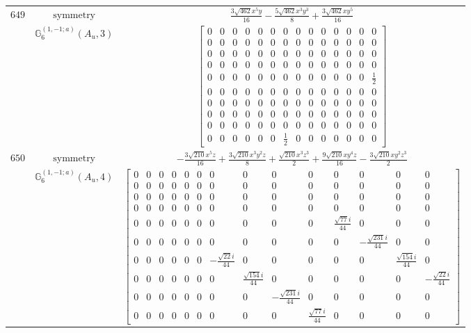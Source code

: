 \documentclass[fleqn,8pt,landscape]{jsarticle}
\begin{document}
\begin{longtable}{ccc}
$ 649 $ & $ \text{symmetry} $ & $ \frac{3 \sqrt{462} x^{5} y}{16} - \frac{5 \sqrt{462} x^{3} y^{3}}{8} + \frac{3 \sqrt{462} x y^{5}}{16} $ \\
$  $ & $ \mathbb{G}_{6}^{(1,-1;a)}(A_{u},3) $ & $ \begin{bmatrix} 0 & 0 & 0 & 0 & 0 & 0 & 0 & 0 & 0 & 0 & 0 & 0 & 0 & 0 \\ 0 & 0 & 0 & 0 & 0 & 0 & 0 & 0 & 0 & 0 & 0 & 0 & 0 & 0 \\ 0 & 0 & 0 & 0 & 0 & 0 & 0 & 0 & 0 & 0 & 0 & 0 & 0 & 0 \\ 0 & 0 & 0 & 0 & 0 & 0 & 0 & 0 & 0 & 0 & 0 & 0 & 0 & 0 \\ 0 & 0 & 0 & 0 & 0 & 0 & 0 & 0 & 0 & 0 & 0 & 0 & 0 & \frac{1}{2} \\ 0 & 0 & 0 & 0 & 0 & 0 & 0 & 0 & 0 & 0 & 0 & 0 & 0 & 0 \\ 0 & 0 & 0 & 0 & 0 & 0 & 0 & 0 & 0 & 0 & 0 & 0 & 0 & 0 \\ 0 & 0 & 0 & 0 & 0 & 0 & 0 & 0 & 0 & 0 & 0 & 0 & 0 & 0 \\ 0 & 0 & 0 & 0 & 0 & 0 & 0 & 0 & 0 & 0 & 0 & 0 & 0 & 0 \\ 0 & 0 & 0 & 0 & 0 & 0 & \frac{1}{2} & 0 & 0 & 0 & 0 & 0 & 0 & 0 \end{bmatrix} $ \\ \hline
$ 650 $ & $ \text{symmetry} $ & $ - \frac{3 \sqrt{210} x^{5} z}{16} + \frac{3 \sqrt{210} x^{3} y^{2} z}{8} + \frac{\sqrt{210} x^{3} z^{3}}{2} + \frac{9 \sqrt{210} x y^{4} z}{16} - \frac{3 \sqrt{210} x y^{2} z^{3}}{2} $ \\
$  $ & $ \mathbb{G}_{6}^{(1,-1;a)}(A_{u},4) $ & $ \begin{bmatrix} 0 & 0 & 0 & 0 & 0 & 0 & 0 & 0 & 0 & 0 & 0 & 0 & 0 & 0 \\ 0 & 0 & 0 & 0 & 0 & 0 & 0 & 0 & 0 & 0 & 0 & 0 & 0 & 0 \\ 0 & 0 & 0 & 0 & 0 & 0 & 0 & 0 & 0 & 0 & 0 & 0 & 0 & 0 \\ 0 & 0 & 0 & 0 & 0 & 0 & 0 & 0 & 0 & 0 & 0 & 0 & 0 & 0 \\ 0 & 0 & 0 & 0 & 0 & 0 & 0 & 0 & 0 & 0 & \frac{\sqrt{77} i}{44} & 0 & 0 & 0 \\ 0 & 0 & 0 & 0 & 0 & 0 & 0 & 0 & 0 & 0 & 0 & - \frac{\sqrt{231} i}{44} & 0 & 0 \\ 0 & 0 & 0 & 0 & 0 & 0 & - \frac{\sqrt{22} i}{44} & 0 & 0 & 0 & 0 & 0 & \frac{\sqrt{154} i}{44} & 0 \\ 0 & 0 & 0 & 0 & 0 & 0 & 0 & \frac{\sqrt{154} i}{44} & 0 & 0 & 0 & 0 & 0 & - \frac{\sqrt{22} i}{44} \\ 0 & 0 & 0 & 0 & 0 & 0 & 0 & 0 & - \frac{\sqrt{231} i}{44} & 0 & 0 & 0 & 0 & 0 \\ 0 & 0 & 0 & 0 & 0 & 0 & 0 & 0 & 0 & \frac{\sqrt{77} i}{44} & 0 & 0 & 0 & 0 \end{bmatrix} $ \\ \hline

\end{longtable}
\end{document}
